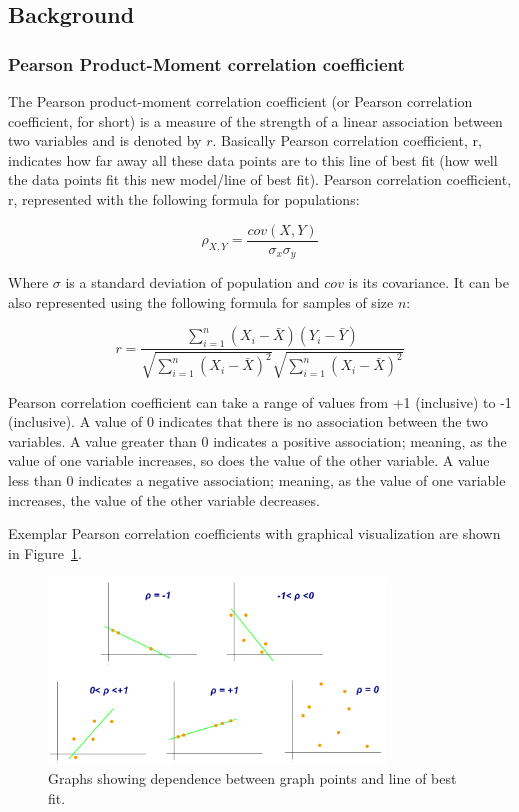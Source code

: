 \subsection{Background}
\subsubsection{Pearson Product-Moment correlation coefficient}

The Pearson product-moment correlation coefficient (or Pearson correlation coefficient, for short) is a measure of the strength of a linear association between two variables and is denoted by $r$.
Basically Pearson correlation coefficient, r, indicates how far away all these data points are to this line of best fit (how well the data points fit this new model/line of best fit).
Pearson correlation coefficient, r, represented with the following formula for populations:

$$ \rho_{X,Y} = \frac{cov(X,Y)}{\sigma_x \sigma_y}$$

Where $\sigma$ is a standard deviation of population and $cov$ is its covariance.
It can be also represented using the following formula for samples of size $n$:

$$r = \frac{\sum_{i=1}^{n} (X_i - \bar{X}) (Y_i - \bar{Y}) }
{ \sqrt{\sum_{i=1}^{n} (X_i - \bar{X})^2} \sqrt{\sum_{i=1}^{n} (X_i - \bar{X})^2} }$$

Pearson correlation coefficient can take a range of values from +1 (inclusive) to -1 (inclusive).
A value of 0 indicates that there is no association between the two variables.
A value greater than 0 indicates a positive association; meaning, as the value of one variable increases, so does the value of the other variable.
A value less than 0 indicates a negative association; meaning, as the value of one variable increases, the value of the other variable decreases.

Exemplar Pearson correlation coefficients with graphical visualization are shown in Figure~\ref{fig:pearson_graph}.

\begin{figure}[h]
  \centering
  \captionsetup{justification=centering}
    \includegraphics[width=0.8\textwidth]{images/pearson_graphs.png}
  \caption{Graphs showing dependence between graph points and line of best fit.\cite{wiki_pearson}}
  \label{fig:pearson_graph}
\end{figure}

